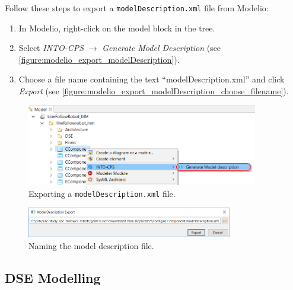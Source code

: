 Follow these steps to export a \texttt{modelDescription.xml} file from Modelio:
%
%
\begin{enumerate}
  \item In Modelio, right-click on the model block in the tree.
  \item Select \textit{INTO-CPS} $\rightarrow$ \textit{Generate Model Description} (see \autoref{figure:modelio_export_modelDescription}).
  \item Choose a file name containing the text ``modelDescription.xml'' and click \textit{Export} (see \autoref{figure:modelio_export_modelDescription_choose_filename}).
\end{enumerate}
%
%
%
\begin{figure}[hpt!]
	\centerline{\includegraphics[width=0.9\textwidth]{figures/modelio_export_modelDescription.png}}
	\caption{Exporting a \texttt{modelDescription.xml} file.}
	\label{figure:modelio_export_modelDescription}
\end{figure}
%
%
%
\begin{figure}[hpt!]
	\centerline{\includegraphics[width=0.8\textwidth]{figures/modelio_export_modelDescription_choose_filename.png}}
	\caption{Naming the model description file.}
	\label{figure:modelio_export_modelDescription_choose_filename}
\end{figure}

\subsection{DSE Modelling}

